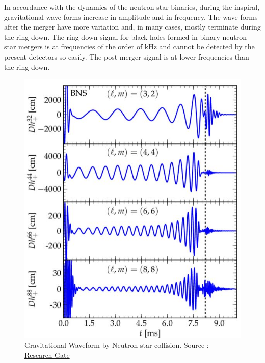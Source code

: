 In accordance with the dynamics of the neutron-star binaries, during the inspiral, gravitational wave forms increase in amplitude and in frequency. 
The wave forms after the merger have more variation and, in many cases, mostly terminate during the ring down. The ring down signal for black holes formed in binary neutron star mergers is at frequencies of the order of kHz and cannot be detected by the present detectors so easily. The post-merger signal is at lower frequencies than the ring down.

\begin{figure}[h]
    \centering
    \includegraphics[scale=0.74]{images.tex/WAVEFORM.jpeg}
    \caption{Gravitational Waveform by Neutron star collision. Source :- \href{https://www.researchgate.net/figure/Binary-neutron-stars-GW-modes-m-3-2-4-4-6-6-8-8-of-polarization_fig13_233846764}{Research Gate}}
\end{figure}

\pagebreak
